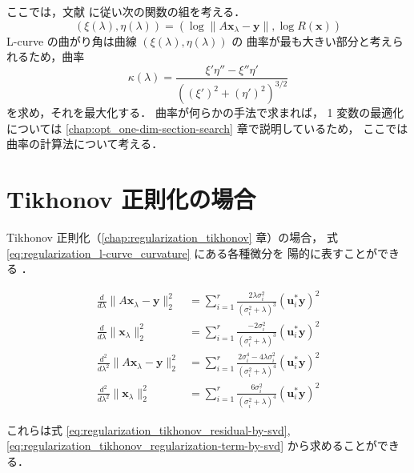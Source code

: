 ここでは，文献 \cite{Hansen1998} に従い次の関数の組を考える．
\begin{equation}
    (\xi(\lambda), \eta(\lambda))
    =(\log\|A \bm{x}_\lambda - \bm{y}\|, \log{R(\bm{x})})
\end{equation}
L-curve の曲がり角は曲線 $(\xi(\lambda), \eta(\lambda))$ の
曲率が最も大きい部分と考えられるため，曲率
\begin{equation}
    \kappa(\lambda) =
    \frac{\xi'\eta'' - \xi''\eta'}
    {\left( (\xi')^2 + (\eta')^2 \right)^{3/2}}
    \label{eq:regularization_l-curve_curvature}
\end{equation}
を求め，それを最大化する．
曲率が何らかの手法で求まれば，
1 変数の最適化については
\ref{chap:opt_one-dim-section-search} 章で説明しているため，
ここでは曲率の計算法について考える．

\section{Tikhonov 正則化の場合}

Tikhonov 正則化（\ref{chap:regularization_tikhonov} 章）の場合，
式 \eqref{eq:regularization_l-curve_curvature} にある各種微分を
陽的に表すことができる
\cite{Hansen1992,Mueller2012}．

\begin{align}
    \frac{d}{d\lambda} \|A \bm{x}_\lambda - \bm{y}\|_2^2
     & = \sum_{i=1}^r \frac{2 \lambda \sigma_i^2}{(\sigma_i^2 + \lambda)^3}
    \left(\bm{u}_i^* \bm{y}\right)^2
    \\
    \frac{d}{d\lambda} \|\bm{x}_\lambda\|_2^2
     & = \sum_{i=1}^r \frac{-2 \sigma_i^2}{(\sigma_i^2 + \lambda)^3}
    \left(\bm{u}_i^* \bm{y}\right)^2
    \\
    \frac{d^2}{d\lambda^2} \|A \bm{x}_\lambda - \bm{y}\|_2^2
     & = \sum_{i=1}^r \frac{2 \sigma_i^4 - 4 \lambda \sigma_i^2}
    {(\sigma_i^2 + \lambda)^4}
    \left(\bm{u}_i^* \bm{y}\right)^2
    \\
    \frac{d^2}{d\lambda^2} \|\bm{x}_\lambda\|_2^2
     & = \sum_{i=1}^r \frac{6 \sigma_i^2}{(\sigma_i^2 + \lambda)^4}
    \left(\bm{u}_i^* \bm{y}\right)^2
\end{align}

これらは式
\eqref{eq:regularization_tikhonov_residual-by-svd},
\eqref{eq:regularization_tikhonov_regularization-term-by-svd}
から求めることができる．
